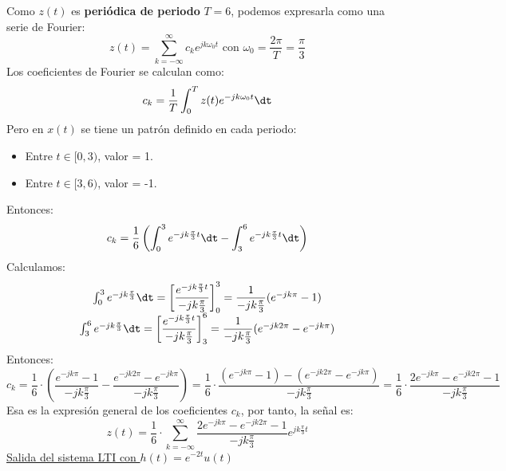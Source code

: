 \begin{enumerate}[label=\color{red}\textbf{\alph*)}]
         Como $z(t)$ es  \textbf{periódica de periodo} $T=6$, podemos expresarla como una serie de Fourier:  \[
         z(t)=\sum_{k=-\infty}^{\infty} c_ke^{jk\omega_0t}\text{ con }\omega_0=\dfrac{2\pi}{T}=\dfrac{\pi}{3} 
         \]
         Los coeficientes de Fourier se calculan como: \[
         c_k=\dfrac{1}{T}\int_{0}^{T} z(t)e^{-jk\omega_0t}\dt  
         \] 
         Pero en $x(t)$ se tiene un patrón definido en cada periodo:
          \begin{itemize}[label=\textbullet]
              \item Entre $t\in [0,3)$, valor = 1.
              \item Entre $t\in [3,6)$, valor = -1.
         \end{itemize}
         Entonces: \[
         c_k=\dfrac{1}{6}\left( \int_{0}^{3} e^{-jk\frac{\pi}{3} t}\dt-\int_{3}^{6} e^{-jk\frac{\pi}{3} t} \dt\right) 
         \] 
         Calculamos: \[
         \begin{array}{c}
             \int_{0}^{3} e^{-jk\frac{\pi}{3} } \dt=\left[ \dfrac{e^{-jk\frac{\pi}{3} t} }{-jk\frac{\pi}{3} } \right]_0^3=\dfrac{1}{-jk\frac{\pi}{3} }(e^{-jk\pi}-1 )\\
             \int_{3}^{6} e^{-jk\frac{\pi}{3} } \dt=\left[ \dfrac{e^{-jk\frac{\pi}{3} t} }{-jk\frac{\pi}{3} } \right]_3^6=\dfrac{1}{-jk\frac{\pi}{3} }(e^{-jk2\pi}-e^{-jk\pi}  )\\
         \end{array}
         \] 
         Entonces:
         \[
         c_k=\dfrac{1}{6}\cdot\left( \dfrac{e^{-jk\pi}-1 }{-jk\frac{\pi}{3} }-\dfrac{e^{-jk 2\pi}-e^{-jk\pi}  }{-jk\frac{\pi}{3} } \right) =\dfrac{1}{6}\cdot \dfrac{(e^{-jk\pi}-1 )-(e^{-jk 2\pi}-e^{-jk\pi} )}{-jk\frac{\pi}{3}}=\dfrac{1}{6}\cdot \dfrac{2e^{-jk\pi}-e^{-jk 2\pi}-1 }{-jk\frac{\pi}{3}}
         \] 
         Esa es la expresión general de los coeficientes $c_k$, por tanto, la señal es:  \[
         z(t)=\dfrac{1}{6}\cdot \sum_{k=-\infty}^{\infty} \dfrac{2e^{-jk\pi}-e^{-jk 2\pi}-1 }{-jk\frac{\pi}{3}}e^{jk\frac{\pi}{3} t} 
         \] 
         \underline{Salida del sistema LTI con $h(t)=e^{-2t}u(t) $} 


\end{enumerate}
